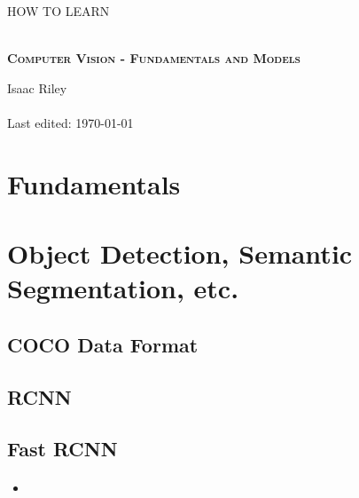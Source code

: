 \documentclass[a4, 12pt]{article}
\begin{document}
\begin{titlepage}


\thispagestyle{fancy}

\vphantom{x}

\vspace{0.5in}

\center


\textsc{\large HOW TO LEARN}

\vspace{0.5in}

\noindent\makebox[\linewidth]{\rule{\linewidth}{1.2pt}}\\
\vspace{2mm}
\textsc{ \textbf{\large Computer Vision - Fundamentals and Models }}
\noindent\makebox[\linewidth]{\rule{\linewidth}{1.2pt}}

\vspace{2.5in}
Isaac Riley\\~\\

Last edited: \today

\end{titlepage}

\newpage

\setcounter{page}{2}
\tableofcontents
\newpage

\section{Fundamentals}


\section{Object Detection, Semantic Segmentation, etc.}

\subsection{COCO Data Format}

\subsection{RCNN}


\subsection{Fast RCNN}
\paragraph{}
\begin{itemize}
    \item
\end{itemize}
\end{document}
